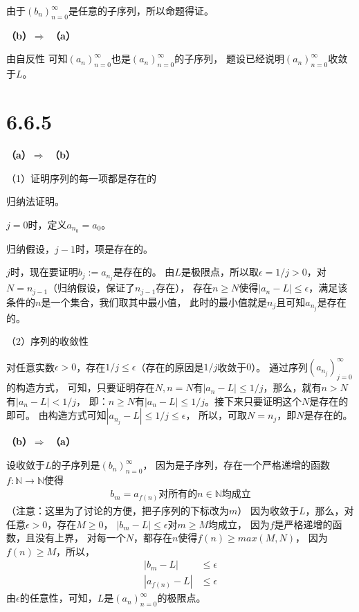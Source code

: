 \documentclass{article}
\theoremstyle{mystyle}
\begin{document}
由于$(b_n)_{n=0}^\infty$是任意的子序列，所以命题得证。

\textbf{（b）$\Rightarrow$ （a）}

由自反性 可知$(a_n)_{n=0}^\infty$也是$(a_n)_{n=0}^\infty$的子序列，
题设已经说明$(a_n)_{n=0}^\infty$收敛于$L$。

\section*{6.6.5}

\textbf{（a）$\Rightarrow$ （b）}

（1）证明序列的每一项都是存在的

归纳法证明。

$j=0$时，定义$a_{n_0}=a_0$。

归纳假设，$j-1$时，项是存在的。

$j$时，现在要证明$b_j:=a_{n_j}$是存在的。
由$L$是极限点，所以取$\epsilon = 1/j > 0$，对$N=n_{j-1}$（归纳假设，保证了$n_{j-1}$存在），
存在$n \geq N$使得$|a_n - L| \leq \epsilon$，满足该条件的$n$是一个集合，我们取其中最小值，
此时的最小值就是$n_j$且可知$a_{n_j}$是存在的。

（2）序列的收敛性

对任意实数$\epsilon > 0$，存在$1/j \leq \epsilon$（存在的原因是$1/j$收敛于$0$）。
通过序列$(a_{n_j})_{j=0}^\infty$的构造方式，
可知，只要证明存在$N, n = N$有$|a_n - L| \leq 1/j$，那么，就有$n > N$有$|a_n - L| < 1/j$，
即：$n \geq N$有$|a_n - L| \leq 1/j$。接下来只要证明这个$N$是存在的即可。
由构造方式可知$|a_{n_j} - L | \leq 1/j \leq \epsilon$，
所以，可取$N = n_j$，即$N$是存在的。


\textbf{（b）$\Rightarrow$ （a）}

设收敛于$L$的子序列是$(b_n)_{n=0}^\infty$，
因为是子序列，存在一个严格递增的函数$f : \mathbb{N} \rightarrow \mathbb{N}$使得
\begin{align*}
  b_m = a_{f(n)} \text{对所有的$n \in \mathbb{N}$均成立}
\end{align*}
（注意：这里为了讨论的方便，把子序列的下标改为$m$）
因为收敛于$L$，那么，对任意$\epsilon > 0$，存在$M \geq 0$，
$|b_m - L| \leq \epsilon$对$m \geq M$均成立，
因为$f$是严格递增的函数，且没有上界，
对每一个$N$，都存在$n$使得$f(n) \geq max(M, N)$，
因为$f(n) \geq M$，所以，
\begin{align*}
  |b_m - L|      & \leq \epsilon \\
  |a_{f(n)} - L| & \leq \epsilon
\end{align*}
由$\epsilon$的任意性，可知，$L$是$(a_n)_{n=0}^\infty$的极限点。
\end{document}
